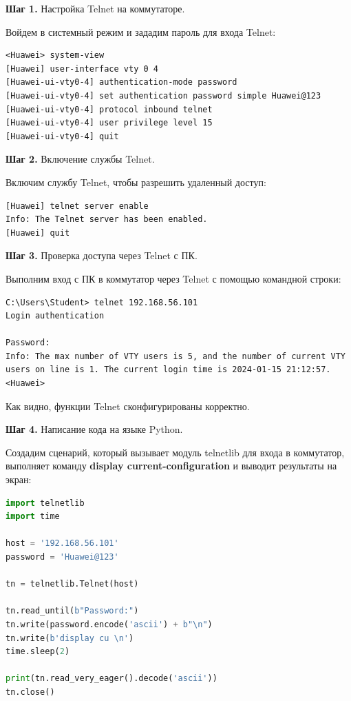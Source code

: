 \textbf{Шаг 1.} Настройка Telnet на коммутаторе.

Войдем в системный режим и зададим пароль для входа Telnet:

\begin{verbatim}
<Huawei> system-view
[Huawei] user-interface vty 0 4
[Huawei-ui-vty0-4] authentication-mode password
[Huawei-ui-vty0-4] set authentication password simple Huawei@123
[Huawei-ui-vty0-4] protocol inbound telnet
[Huawei-ui-vty0-4] user privilege level 15
[Huawei-ui-vty0-4] quit
\end{verbatim}

\textbf{Шаг 2.} Включение службы Telnet.

Включим службу Telnet, чтобы разрешить удаленный доступ:

\begin{verbatim}
[Huawei] telnet server enable
Info: The Telnet server has been enabled.
[Huawei] quit
\end{verbatim}

\textbf{Шаг 3.} Проверка доступа через Telnet с ПК.

Выполним вход с ПК в коммутатор через Telnet с помощью командной строки:

\begin{verbatim}
C:\Users\Student> telnet 192.168.56.101
Login authentication

Password: 
Info: The max number of VTY users is 5, and the number of current VTY 
users on line is 1. The current login time is 2024-01-15 21:12:57.
<Huawei>
\end{verbatim}

Как видно, функции Telnet сконфигурированы корректно.

\textbf{Шаг 4.} Написание кода на языке Python.

Создадим сценарий, который вызывает модуль telnetlib для входа в коммутатор,
выполняет команду \textbf{display current-configuration} и выводит результаты на экран:

\begin{lstlisting}[language=Python, caption=Скрипт автоматизации на Python]
import telnetlib
import time

host = '192.168.56.101'
password = 'Huawei@123'

tn = telnetlib.Telnet(host)

tn.read_until(b"Password:")
tn.write(password.encode('ascii') + b"\n")
tn.write(b'display cu \n')
time.sleep(2)

print(tn.read_very_eager().decode('ascii'))
tn.close()
\end{lstlisting}

